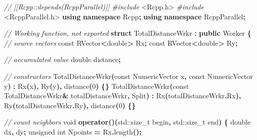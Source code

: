 \documentclass[
  12pt,
  american,
  a4paper,
  extrafontsizes,onecolumn,openright
  ]{memoir}
\newenvironment{Shaded}{\begin{snugshade}}{\end{snugshade}}
\newcommand{\AttributeTok}[1]{\textcolor[rgb]{0.13,0.29,0.53}{#1}}
\newcommand{\BuiltInTok}[1]{#1}
\newcommand{\CommentTok}[1]{\textcolor[rgb]{0.56,0.35,0.01}{\textit{#1}}}
\newcommand{\DataTypeTok}[1]{\textcolor[rgb]{0.13,0.29,0.53}{#1}}
\newcommand{\DecValTok}[1]{\textcolor[rgb]{0.00,0.00,0.81}{#1}}
\newcommand{\ImportTok}[1]{#1}
\newcommand{\KeywordTok}[1]{\textcolor[rgb]{0.13,0.29,0.53}{\textbf{#1}}}
\newcommand{\NormalTok}[1]{#1}
\newcommand{\OperatorTok}[1]{\textcolor[rgb]{0.81,0.36,0.00}{\textbf{#1}}}
\newcommand{\PreprocessorTok}[1]{\textcolor[rgb]{0.56,0.35,0.01}{\textit{#1}}}
\begin{document}
\begin{Shaded}
\begin{Highlighting}[]
\CommentTok{// [[Rcpp::depends(RcppParallel)]]}
\PreprocessorTok{\#include }\ImportTok{\textless{}Rcpp.h\textgreater{}}
\PreprocessorTok{\#include }\ImportTok{\textless{}RcppParallel.h\textgreater{}}
\KeywordTok{using} \KeywordTok{namespace}\NormalTok{ Rcpp}\OperatorTok{;}
\KeywordTok{using} \KeywordTok{namespace}\NormalTok{ RcppParallel}\OperatorTok{;}

\CommentTok{// Working function, not exported}
\KeywordTok{struct}\NormalTok{ TotalDistanceWrkr }\OperatorTok{:} \KeywordTok{public}\NormalTok{ Worker}
\OperatorTok{\{}
  \CommentTok{// source vectors}
  \AttributeTok{const}\NormalTok{ RVector}\OperatorTok{\textless{}}\DataTypeTok{double}\OperatorTok{\textgreater{}}\NormalTok{ Rx}\OperatorTok{;}
  \AttributeTok{const}\NormalTok{ RVector}\OperatorTok{\textless{}}\DataTypeTok{double}\OperatorTok{\textgreater{}}\NormalTok{ Ry}\OperatorTok{;}
  
  \CommentTok{// accumulated value}
  \DataTypeTok{double}\NormalTok{ distance}\OperatorTok{;}
   
  \CommentTok{// constructors}
\NormalTok{  TotalDistanceWrkr}\OperatorTok{(}\AttributeTok{const}\NormalTok{ NumericVector x}\OperatorTok{,} \AttributeTok{const}\NormalTok{ NumericVector y}\OperatorTok{)} \OperatorTok{:}
\NormalTok{    Rx}\OperatorTok{(}\NormalTok{x}\OperatorTok{),}\NormalTok{ Ry}\OperatorTok{(}\NormalTok{y}\OperatorTok{),}\NormalTok{ distance}\OperatorTok{(}\DecValTok{0}\OperatorTok{)} \OperatorTok{\{\}}
\NormalTok{  TotalDistanceWrkr}\OperatorTok{(}\AttributeTok{const}\NormalTok{ TotalDistanceWrkr}\OperatorTok{\&}\NormalTok{ totalDistanceWrkr}\OperatorTok{,}\NormalTok{ Split}\OperatorTok{)} \OperatorTok{:}
\NormalTok{    Rx}\OperatorTok{(}\NormalTok{totalDistanceWrkr}\OperatorTok{.}\NormalTok{Rx}\OperatorTok{),}\NormalTok{ Ry}\OperatorTok{(}\NormalTok{totalDistanceWrkr}\OperatorTok{.}\NormalTok{Ry}\OperatorTok{),}\NormalTok{  distance}\OperatorTok{(}\DecValTok{0}\OperatorTok{)} \OperatorTok{\{\}}
  
  \CommentTok{// count neighbors}
  \DataTypeTok{void} \KeywordTok{operator}\OperatorTok{()(}\BuiltInTok{std::}\NormalTok{size\_t begin}\OperatorTok{,} \BuiltInTok{std::}\NormalTok{size\_t end}\OperatorTok{)} \OperatorTok{\{}
    \DataTypeTok{double}\NormalTok{ dx}\OperatorTok{,}\NormalTok{ dy}\OperatorTok{;}
    \DataTypeTok{unsigned} \DataTypeTok{int}\NormalTok{ Npoints }\OperatorTok{=}\NormalTok{ Rx}\OperatorTok{.}\NormalTok{length}\OperatorTok{();}


\end{Highlighting}
\end{Shaded}
\end{document}
